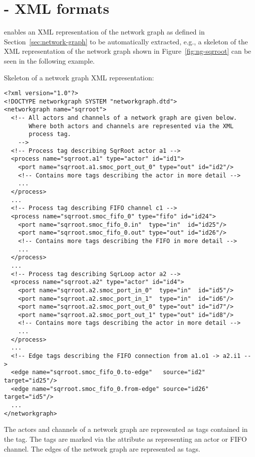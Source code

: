 \chapter{\SysteMoC{} - XML formats}\label{sec:systemoc-ngx}

\SysteMoC{} enables an XML representation of the network graph as defined in Section~\ref{sec:network-graph} to be automatically extracted, e.g., a skeleton of the XML representation of the network graph shown in Figure~\ref{fig:ng-sqrroot} can be seen in the following example.

%

\begin{example}
Skeleton of a network graph XML representation:
\begin{verbatim}
<?xml version="1.0"?>
<!DOCTYPE networkgraph SYSTEM "networkgraph.dtd">
<networkgraph name="sqrroot">
  <!-- All actors and channels of a network graph are given below.
       Where both actors and channels are represented via the XML
       process tag.
    -->
  <!-- Process tag describing SqrRoot actor a1 -->
  <process name="sqrroot.a1" type="actor" id="id1">
    <port name="sqrroot.a1.smoc_port_out_0" type="out" id="id2"/>
    <!-- Contains more tags describing the actor in more detail -->
    ...
  </process>
  ...
  <!-- Process tag describing FIFO channel c1 -->
  <process name="sqrroot.smoc_fifo_0" type="fifo" id="id24">
    <port name="sqrroot.smoc_fifo_0.in"  type="in"  id="id25"/>
    <port name="sqrroot.smoc_fifo_0.out" type="out" id="id26"/>
    <!-- Contains more tags describing the FIFO in more detail -->
    ...
  </process>
  ...
  <!-- Process tag describing SqrLoop actor a2 -->
  <process name="sqrroot.a2" type="actor" id="id4">
    <port name="sqrroot.a2.smoc_port_in_0"  type="in"  id="id5"/>
    <port name="sqrroot.a2.smoc_port_in_1"  type="in"  id="id6"/>
    <port name="sqrroot.a2.smoc_port_out_0" type="out" id="id7"/>
    <port name="sqrroot.a2.smoc_port_out_1" type="out" id="id8"/>
    <!-- Contains more tags describing the actor in more detail -->
    ...
  </process>
  ...
  <!-- Edge tags describing the FIFO connection from a1.o1 -> a2.i1 -->
  <edge name="sqrroot.smoc_fifo_0.to-edge"   source="id2"  target="id25"/>
  <edge name="sqrroot.smoc_fifo_0.from-edge" source="id26" target="id5"/>
  ...
</networkgraph>
\end{verbatim}
\end{example}

The actors and channels of a network graph are represented as  tags contained in the  tag.
The  tags are marked via the attribute  as representing an actor or FIFO channel.
The edges of the network graph are represented as  tags.

